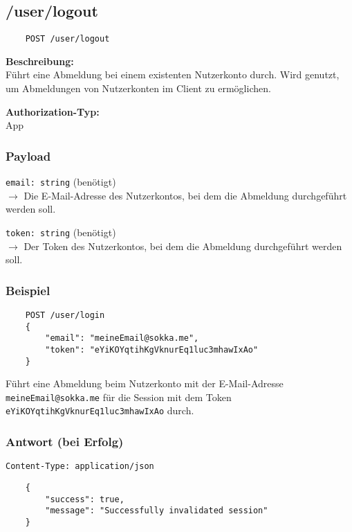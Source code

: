 \subsection{/user/logout}
\label{applogout}

\begin{lstlisting}
    POST /user/logout
\end{lstlisting}

\textbf{Beschreibung:} \\
Führt eine Abmeldung bei einem existenten Nutzerkonto durch. Wird genutzt, um Abmeldungen von Nutzerkonten im Client zu ermöglichen.

\textbf{Authorization-Typ:} \\
App

\subsubsection{Payload}

\lstinline{email: string} (benötigt) \\
$\rightarrow$ Die E-Mail-Adresse des Nutzerkontos, bei dem die Abmeldung durchgeführt werden soll.

\lstinline{token: string} (benötigt) \\
$\rightarrow$ Der Token des Nutzerkontos, bei dem die Abmeldung durchgeführt werden soll.

\subsubsection{Beispiel}

\begin{lstlisting}
    POST /user/login
    {
        "email": "meineEmail@sokka.me",
        "token": "eYiKOYqtihKgVknurEq1luc3mhawIxAo"
    }
\end{lstlisting}

Führt eine Abmeldung beim Nutzerkonto mit der E-Mail-Adresse \lstinline{meineEmail@sokka.me} für die Session mit dem Token \lstinline{eYiKOYqtihKgVknurEq1luc3mhawIxAo} durch.

\subsubsection{Antwort (bei Erfolg)}

\lstinline{Content-Type: application/json}
\begin{lstlisting}
    {
        "success": true, 
        "message": "Successfully invalidated session"
    }
\end{lstlisting}

